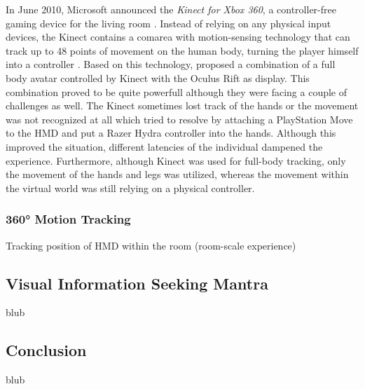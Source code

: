 In June 2010, Microsoft announced the \textit{Kinect for Xbox 360}, a controller-free gaming device for the living room \citep{Microsoft2010}. Instead of relying on any physical input devices, the Kinect contains a comarea with motion-sensing technology that can track up to 48 points of movement on the human body, turning the player himself into a controller \citep{Microsoft2010}. \newline
Based on this technology, \cite{Takala2014} proposed a combination of a full body avatar controlled by Kinect with the Oculus Rift as display. This combination proved to be quite powerfull although they were facing a couple of challenges as well. The Kinect sometimes lost track of the hands or the movement was not recognized at all which \cite{Takala2014} tried to resolve by attaching a PlayStation Move to the HMD and put a Razer Hydra controller into the hands. Although this improved the situation, different latencies of the individual dampened the experience. Furthermore, although Kinect was used for full-body tracking, only the movement of the hands and legs was utilized, whereas the movement within the virtual world was still relying on a physical controller.


\subsubsection{360° Motion Tracking}

Tracking position of HMD within the room (room-scale experience)
\cite{Htcvive2016}



\subsection{Visual Information Seeking Mantra}

blub




\subsection{Conclusion}

blub




